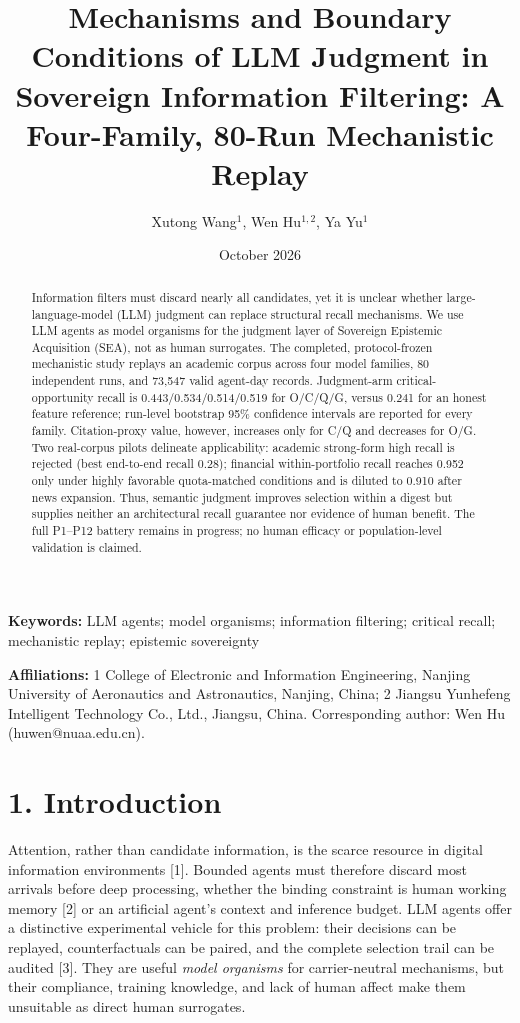 \documentclass[
  conference,10pt]{IEEEtran}
\title{Mechanisms and Boundary Conditions of LLM Judgment in Sovereign Information Filtering: A Four-Family, 80-Run Mechanistic Replay}
\author{Xutong Wang\(^{1}\), Wen Hu\(^{1,2}\), Ya Yu\(^{1}\)}
\date{October 2026}
\begin{document}
\maketitle
\begin{abstract}
Information filters must discard nearly all candidates, yet it is unclear whether large-language-model (LLM) judgment can replace structural recall mechanisms. We use LLM agents as model organisms for the judgment layer of Sovereign Epistemic Acquisition (SEA), not as human surrogates. The completed, protocol-frozen mechanistic study replays an academic corpus across four model families, 80 independent runs, and 73,547 valid agent-day records. Judgment-arm critical-opportunity recall is 0.443/0.534/0.514/0.519 for O/C/Q/G, versus 0.241 for an honest feature reference; run-level bootstrap 95\% confidence intervals are reported for every family. Citation-proxy value, however, increases only for C/Q and decreases for O/G. Two real-corpus pilots delineate applicability: academic strong-form high recall is rejected (best end-to-end recall 0.28); financial within-portfolio recall reaches 0.952 only under highly favorable quota-matched conditions and is diluted to 0.910 after news expansion. Thus, semantic judgment improves selection within a digest but supplies neither an architectural recall guarantee nor evidence of human benefit. The full P1--P12 battery remains in progress; no human efficacy or population-level validation is claimed.
\end{abstract}

\textbf{Keywords:} LLM agents; model organisms; information filtering; critical recall; mechanistic replay; epistemic sovereignty

\textbf{Affiliations:} 1 College of Electronic and Information Engineering, Nanjing University of Aeronautics and Astronautics, Nanjing, China; 2 Jiangsu Yunhefeng Intelligent Technology Co., Ltd., Jiangsu, China. Corresponding author: Wen Hu (huwen@nuaa.edu.cn).

\section{1. Introduction}\label{introduction}

Attention, rather than candidate information, is the scarce resource in digital information environments {[}1{]}. Bounded agents must therefore discard most arrivals before deep processing, whether the binding constraint is human working memory {[}2{]} or an artificial agent's context and inference budget. LLM agents offer a distinctive experimental vehicle for this problem: their decisions can be replayed, counterfactuals can be paired, and the complete selection trail can be audited {[}3{]}. They are useful \emph{model organisms} for carrier-neutral mechanisms, but their compliance, training knowledge, and lack of human affect make them unsuitable as direct human surrogates.
\end{document}

